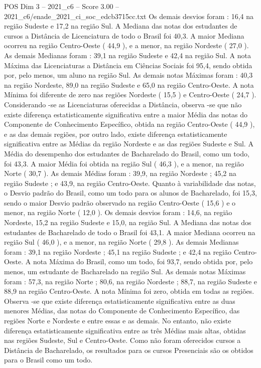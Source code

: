 \begin{textsample}{POS Dim 3 – 2021\_c6 – Score 3.00 – 2021\_c6/enade\_2021\_ci\_soc\_edcb3715cc.txt}
Os demais desvios foram : 16,4 na região Sudeste e 17,2 na região Sul.
A Mediana das notas dos estudantes de cursos a Distância de Licenciatura de todo o Brasil foi 40,3.
A maior Mediana ocorreu na região Centro-Oeste ( 44,9 ), e a menor, na região Nordeste ( 27,0 ).
As demais Medianas foram : 39,1 na região Sudeste e 42,4 na região Sul.
A nota Máxima das Licenciaturas a Distância em Ciências Sociais foi 95,4, sendo obtida por, pelo menos, um aluno na região Sul.
As demais notas Máximas foram : 40,3 na região Nordeste, 89,0 na região Sudeste e 65,0 na região Centro-Oeste.
A nota Mínima foi diferente de zero nas regiões Nordeste ( 15,5 ) e Centro-Oeste ( 24,7 ).
Considerando -se as Licenciaturas oferecidas a Distância, observa -se que não existe diferença estatisticamente significativa entre a maior Média das notas do Componente de Conhecimento Específico, obtida na região Centro-Oeste ( 44,9 ), e as das demais regiões, por outro lado, existe diferença estatisticamente significativa entre as Médias da região Nordeste e as das regiões Sudeste e Sul.
A Média do desempenho dos estudantes de Bacharelado do Brasil, como um todo, foi 43,3.
A maior Média foi obtida na região Sul ( 46,3 ), e a menor, na região Norte ( 30,7 ).
As demais Médias foram : 39,9, na região Nordeste ; 45,2 na região Sudeste ; e 43,9, na região Centro-Oeste.
Quanto à variabilidade das notas, o Desvio padrão do Brasil, como um todo para os alunos de Bacharelado, foi 15,3, sendo o maior Desvio padrão observado na região Centro-Oeste ( 15,6 ) e o menor, na região Norte ( 12,0 ).
Os demais desvios foram : 14,6, na região Nordeste, 15,2 na região Sudeste e 15,0, na região Sul.
A Mediana das notas dos estudantes de Bacharelado de todo o Brasil foi 43,1.
A maior Mediana ocorreu na região Sul ( 46,0 ), e a menor, na região Norte ( 29,8 ).
As demais Medianas foram : 39,1 na região Nordeste ; 45,1 na região Sudeste ; e 42,4 na região Centro-Oeste.
A nota Máxima do Brasil, como um todo, foi 93,7, sendo obtida por, pelo menos, um estudante de Bacharelado na região Sul.
As demais notas Máximas foram : 57,3, na região Norte ; 80,6, na região Nordeste ; 88,7, na região Sudeste e 88,9 na região Centro-Oeste.
A nota Mínima foi zero, obtida em todas as regiões.
Observa -se que existe diferença estatisticamente significativa entre as duas menores Médias, das notas do Componente de Conhecimento Específico, das regiões Norte e Nordeste e entre essas e as demais.
No entanto, não existe diferença estatisticamente significativa entre as três Médias mais altas, obtidas nas regiões Sudeste, Sul e Centro-Oeste.
Como não foram oferecidos cursos a Distância de Bacharelado, os resultados para os cursos Presenciais são os obtidos para o Brasil como um todo.

\end{textsample}
